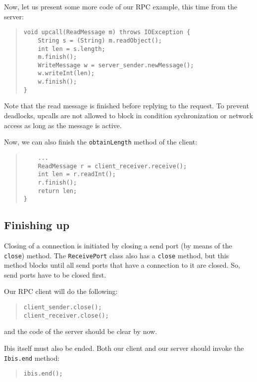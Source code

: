 \documentclass[10pt]{article}
\begin{document}
Now, let us present some more code of our RPC example, this time
from the server:

\begin{quote}
\begin{verbatim}
void upcall(ReadMessage m) throws IOException {
    String s = (String) m.readObject();
    int len = s.length;
    m.finish();
    WriteMessage w = server_sender.newMessage();
    w.writeInt(len);
    w.finish();
}
\end{verbatim}
\end{quote}

Note that the read message is finished before replying to the
request. To prevent deadlocks, upcalls are not allowed to block in
condition sychronization or network access as long as the message
is active.

Now, we can also finish the \verb+obtainLength+ method of the client:
\begin{quote}
\begin{verbatim}
    ...
    ReadMessage r = client_receiver.receive();
    int len = r.readInt();
    r.finish();
    return len;
}
\end{verbatim}
\end{quote}

\subsection{Finishing up}

Closing of a connection is initiated by closing a send port
(by means of the \verb+close+) method. The \verb+ReceivePort+
class also has a \verb+close+ method, but this method blocks
until all send ports that have a connection to it are closed.
So, send ports have to be closed first.

Our RPC client will do the following:

\begin{quote}
\begin{verbatim}
client_sender.close();
client_receiver.close();
\end{verbatim}
\end{quote}
and the code of the server should be clear by now.

Ibis itself must also be ended. Both our client and our server
should invoke the \verb+Ibis.end+ method:
\begin{quote}
\begin{verbatim}
ibis.end();
\end{verbatim}
\end{quote}
\end{document}
